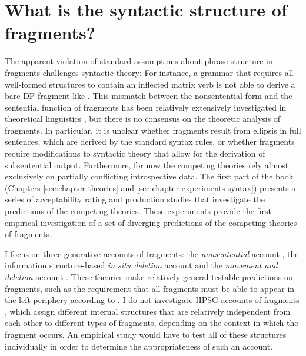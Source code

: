 \section{What is the syntactic structure of fragments?}
The apparent violation of standard assumptions about phrase structure in fragments challenges syntactic theory: For instance, a grammar that requires all well-formed structures to contain an inflected matrix verb is not able to derive a bare DP fragment like \Last[a]. This mismatch between the nonsentential form and the sentential function of fragments has been relatively extensively investigated in theoretical linguistics \citep[see e.g.][]{morgan1973, ginzburg.sag2000, fernandez.ginzburg2002, schlangen2003, merchant2004,barton.progovac2005, culicover.jackendoff2005, stainton2006, reich2007, weir2014, ott.struckmeier2016}, but there is no consensus on the theoretic analysis of fragments. In particular, it is unclear whether fragments result from ellipsis in full sentences, which are derived by the standard syntax rules, or whether fragments require modifications to syntactic theory that allow for the derivation of subsentential output. Furthermore, for now the competing theories rely almost exclusively on partially conflicting introspective data. The first part of the book (Chapters \ref{sec:chapter-theories} and \ref{sec:chapter-experiments-syntax}) presents a series of acceptability rating and production studies that investigate the predictions of the competing theories. These experiments provide the first empirical investigation of a set of diverging predictions of the competing theories of fragments.

I focus on three generative accounts of fragments: the \textit{nonsentential} account \citep[e.g.][]{barton.progovac2005, progovac2006}, the information structure-based \textit{in situ deletion} account \citep{reich2007, ott.struckmeier2016} and the \textit{movement and deletion} account \citep{merchant2004, weir2014}. These theories make relatively general testable predictions on fragments, such as the requirement that all fragments must be able to appear in the left periphery according to \citet{merchant2004}. I do not investigate HPSG accounts of fragments \citep{ginzburg.sag2000, fernandez.ginzburg2002, schlangen2003}, which assign different internal structures that are relatively independent from each other to different types of fragments, depending on the context in which the fragment occurs. An empirical study would have to test all of these structures individually in order to determine the appropriateness of such an account.

